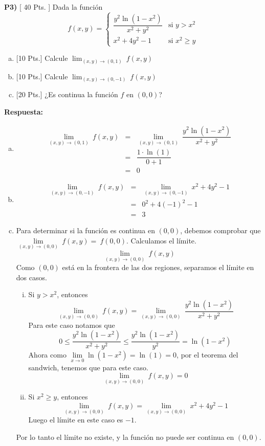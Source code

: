 \documentclass{article}
\begin{document}
\newpage
\noindent\textbf{P3) } \textsf{[ 40 Pts. ] } Dada la función
$$f(x,y) =\begin{cases}
  \dfrac{y^2\ln\left(1-x^2\right)}{x^2+y^2} & \text{si } y>x^2\\
  x^2+4y^2-1  & \text{si } x^2\geq y
\end{cases}$$
\begin{enumerate}[a)]
  \item \textsf{[10 Pts.] } Calcule $\displaystyle\lim_{(x,y)\to (0,1)}\ f(x,y)$
  \item \textsf{[10 Pts.] } Calcule $\displaystyle\lim_{(x,y)\to (0,-1)}\ f(x,y)$
  \item \textsf{[20 Pts.] }¿Es continua la función $f$ en $(0,0)$?
\end{enumerate}

\vspace{2mm}
\noindent\textbf{Respuesta:} 
\begin{enumerate}[a)]
  \item 
    \begin{eqnarray*}
      \lim_{(x,y)\to (0,1)}\ f(x,y)
      &=& \lim_{(x,y)\to (0,1)}\ \dfrac{y^2\ln\left(1-x^2\right)}{x^2+y^2}\\
      &=& \dfrac{1\cdot\ln(1)}{0+1}\\
      &=& 0
    \end{eqnarray*}
  \vspace{2mm}
  \item 
    \begin{eqnarray*}
      \lim_{(x,y)\to (0,-1)}\ f(x,y)
      &=& \lim_{(x,y)\to (0,-1)}\ x^2+4y^2-1\\
      &=& 0^2+4(-1)^2-1\\
      &=& 3
    \end{eqnarray*}
  \vspace{2mm}
  \item Para determinar si la función es continua en $(0,0)$, debemos comprobar que $\lim\limits_{(x,y)\to (0,0)}\ f(x,y) =~f(0,0)$. Calculamos el límite.
    $$\lim_{(x,y)\to (0,0)}\ f(x,y)$$
    Como $(0,0)$ está en la frontera de las dos regiones, separamos el límite en dos casos.
    \begin{enumerate}[i.]
      \item Si $y>x^2$, entonces
        $$\lim_{(x,y)\to (0,0)}\ f(x,y) = \lim_{(x,y)\to (0,0)}\ \dfrac{y^2\ln\left(1-x^2\right)}{x^2+y^2}$$
        Para este caso notamos que
        $$0\leq \dfrac{y^2\ln\left(1-x^2\right)}{x^2+y^2} \leq \frac{y^2\ln(1-x^2)}{y^2}=\ln(1-x^2)$$
        Ahora como $\lim\limits_{x\to 0}\ln(1-x^2)=\ln(1)=0$, por el teorema del sandwich, tenemos que para este caso.
        $$\lim_{(x,y)\to (0,0)}\ f(x,y) = 0$$
      \item Si $x^2\geq y$, entonces
        $$\lim_{(x,y)\to (0,0)}\ f(x,y) = \lim_{(x,y)\to (0,0)}\ x^2+4y^2-1$$
        Luego el límite en este caso es $-1$.
    \end{enumerate}
    Por lo tanto el límite no existe, y la función no puede ser continua en $(0,0)$.
\end{enumerate}
\end{document}
